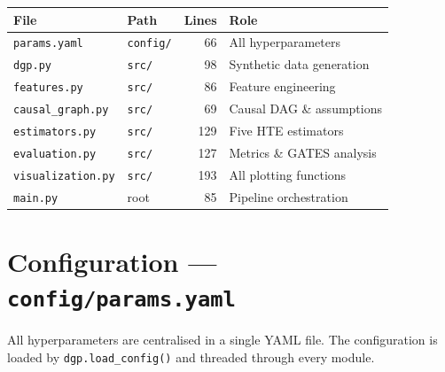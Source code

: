\documentclass[11pt, letterpaper]{article}
\begin{document}
\begin{center}
\begin{tabular}{llrl}
    \toprule
    \textbf{File} & \textbf{Path} & \textbf{Lines} & \textbf{Role} \\
    \midrule
    \texttt{params.yaml}       & \texttt{config/}  & 66  & All hyperparameters \\
    \texttt{dgp.py}            & \texttt{src/}     & 98  & Synthetic data generation \\
    \texttt{features.py}       & \texttt{src/}     & 86  & Feature engineering \\
    \texttt{causal\_graph.py}  & \texttt{src/}     & 69  & Causal DAG \& assumptions \\
    \texttt{estimators.py}     & \texttt{src/}     & 129 & Five HTE estimators \\
    \texttt{evaluation.py}     & \texttt{src/}     & 127 & Metrics \& GATES analysis \\
    \texttt{visualization.py}  & \texttt{src/}     & 193 & All plotting functions \\
    \texttt{main.py}           & root              & 85  & Pipeline orchestration \\
    \bottomrule
\end{tabular}
\end{center}


\newpage
\section{Configuration --- \texttt{config/params.yaml}}
\label{sec:config}

All hyperparameters are centralised in a single YAML file.
The configuration is loaded by \texttt{dgp.load\_config()} and threaded through every module.
\end{document}
